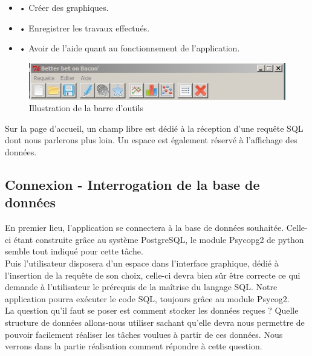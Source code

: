 \documentclass[a4paper,10pt]{report}
\begin{document}
\begin{itemize}

\item • Créer des graphiques.

\item • Enregistrer les travaux effectués.

\item • Avoir de l'aide quant au fonctionnement de l'application.

\end{itemize}


\begin{figure}[H]

\centering
\includegraphics[scale=0.6]{barre.jpg}
\caption{Illustration de la barre d'outils}

\end{figure} 


Sur la page d’accueil, un champ libre est dédié à la réception d’une requête SQL dont nous parlerons plus loin. Un espace est également réservé à l’affichage des données.


\subsection{Connexion - Interrogation de la base de données}


En premier lieu, l'application se connectera à la base de données souhaitée. Celle-ci étant construite grâce au système PostgreSQL, le module Psycopg2 de python semble tout indiqué pour cette tâche.\\

Puis l'utilisateur disposera d'un espace dans l'interface graphique, dédié à l'insertion de la requête de son choix, celle-ci devra bien sûr être correcte ce qui demande à l’utilisateur le prérequis de la maîtrise du langage SQL.  Notre application pourra exécuter le code SQL, toujours grâce au module Psycog2.\\

La question qu’il faut se poser est comment stocker les données reçues ? Quelle structure de données allons-nous utiliser sachant qu’elle devra nous permettre de pouvoir facilement réaliser les tâches voulues à partir de ces données. Nous verrons dans la partie réalisation comment répondre à cette question.\\
\end{document}
